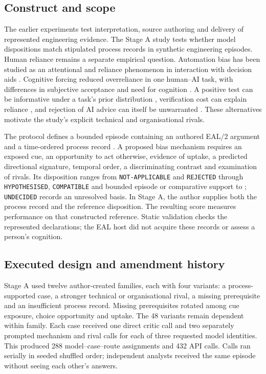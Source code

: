 \documentclass[preprint,12pt]{elsarticle}
\begin{document}
\subsection{Construct and scope}
The earlier experiments test interpretation, source authoring and delivery of represented engineering evidence. The Stage A study tests whether model dispositions match stipulated process records in synthetic engineering episodes. Human reliance remains a separate empirical question. Automation bias has been studied as an attentional and reliance phenomenon in interaction with decision aids \citep{parasuraman2010}. Cognitive forcing reduced overreliance in one human--AI task, with differences in subjective acceptance and need for cognition \citep{bucinca2021}. A positive test can be informative under a task's prior distribution \citep{klayman1987}, verification cost can explain reliance \citep{vasconcelos2023}, and rejection of AI advice can itself be unwarranted \citep{dietvorst2015}. These alternatives motivate the study's explicit technical and organisational rivals.

The protocol defines a bounded episode containing an authored EAL/2 argument and a time-ordered process record \citep{earlBiasProtocol}. A proposed bias mechanism requires an exposed cue, an opportunity to act otherwise, evidence of uptake, a predicted directional signature, temporal order, a discriminating contrast and examination of rivals. Its disposition ranges from \texttt{NOT-APPLICABLE} and \texttt{REJECTED} through \texttt{HYPOTHESISED}, \texttt{COMPATIBLE} and bounded episode or comparative support to ; \texttt{UNDECIDED} records an unresolved basis. In Stage A, the author supplies both the process record and the reference disposition. The resulting score measures performance on that constructed reference. Static validation checks the represented declarations; the EAL host did not acquire these records or assess a person's cognition.

\subsection{Executed design and amendment history}
Stage A used twelve author-created families, each with four variants: a process-supported case, a stronger technical or organisational rival, a missing prerequisite and an insufficient process record. Missing prerequisites rotated among cue exposure, choice opportunity and uptake. The 48 variants remain dependent within family. Each case received one direct critic call and two separately prompted mechanism and rival calls for each of three requested model identities. This produced 288 model--case--route assignments and 432 API calls. Calls ran serially in seeded shuffled order; independent analysts received the same episode without seeing each other's answers.
\end{document}
